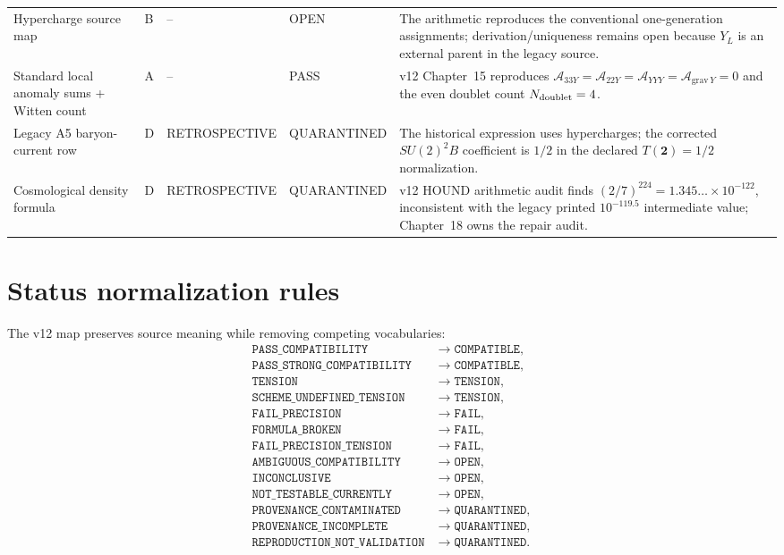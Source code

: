 {\begin{longtable}{p{}p{}p{}p{}p{}}
Hypercharge source map & B & -- & OPEN & The arithmetic reproduces the conventional one-generation assignments; derivation/uniqueness remains open because $Y_L$ is an external parent in the legacy source. \\
Standard local anomaly sums + Witten count & A & -- & PASS & v12 Chapter~15 reproduces $\mathcal A_{33Y}=\mathcal A_{22Y}=\mathcal A_{YYY}=\mathcal A_{\mathrm{grav}\,Y}=0$ and the even doublet count $N_{\rm doublet}=4$. \\
Legacy A5 baryon-current row & D & RETROSPECTIVE & QUARANTINED & The historical expression uses hypercharges; the corrected $SU(2)^2B$ coefficient is $1/2$ in the declared $T(\mathbf2)=1/2$ normalization. \\
Cosmological density formula & D & RETROSPECTIVE & QUARANTINED & v12 HOUND arithmetic audit finds $(2/7)^{224}=1.345\ldots\times10^{-122}$, inconsistent with the legacy printed $10^{-119.5}$ intermediate value; Chapter~18 owns the repair audit. \\
\bottomrule
\end{longtable}}

\section{Status normalization rules}

The v12 map preserves source meaning while removing competing vocabularies:
\begin{align*}
\texttt{PASS\_COMPATIBILITY}
&\longrightarrow \texttt{COMPATIBLE},\\
\texttt{PASS\_STRONG\_COMPATIBILITY}
&\longrightarrow \texttt{COMPATIBLE},\\
\texttt{TENSION}
&\longrightarrow \texttt{TENSION},\\
\texttt{SCHEME\_UNDEFINED\_TENSION}
&\longrightarrow \texttt{TENSION},\\
\texttt{FAIL\_PRECISION}
&\longrightarrow \texttt{FAIL},\\
\texttt{FORMULA\_BROKEN}
&\longrightarrow \texttt{FAIL},\\
\texttt{FAIL\_PRECISION\_TENSION}
&\longrightarrow \texttt{FAIL},\\
\texttt{AMBIGUOUS\_COMPATIBILITY}
&\longrightarrow \texttt{OPEN},\\
\texttt{INCONCLUSIVE}
&\longrightarrow \texttt{OPEN},\\
\texttt{NOT\_TESTABLE\_CURRENTLY}
&\longrightarrow \texttt{OPEN},\\
\texttt{PROVENANCE\_CONTAMINATED}
&\longrightarrow \texttt{QUARANTINED},\\
\texttt{PROVENANCE\_INCOMPLETE}
&\longrightarrow \texttt{QUARANTINED},\\
\texttt{REPRODUCTION\_NOT\_VALIDATION}
&\longrightarrow \texttt{QUARANTINED}.
\end{align*}

